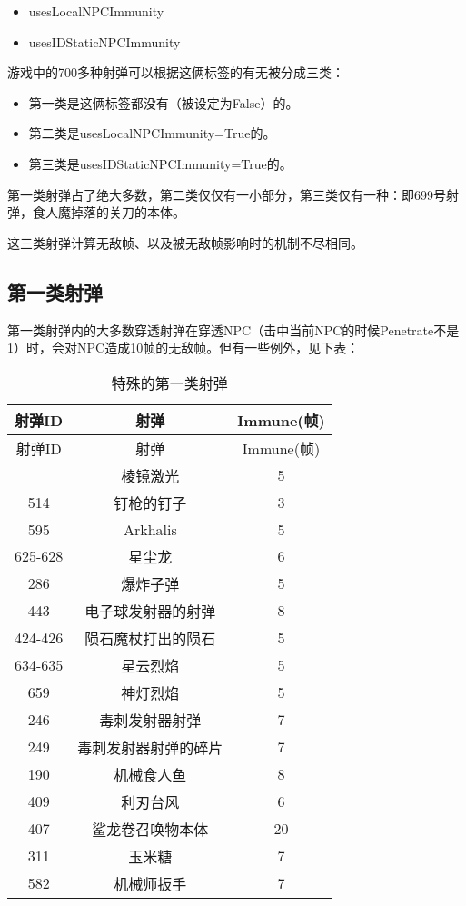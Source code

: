 \begin{itemize}
\item usesLocalNPCImmunity
\item usesIDStaticNPCImmunity
\end{itemize}

游戏中的700多种射弹可以根据这俩标签的有无被分成三类：

\begin{itemize}
\item 第一类是这俩标签都没有（被设定为False）的。
\item 第二类是usesLocalNPCImmunity=True的。
\item 第三类是usesIDStaticNPCImmunity=True的。
\end{itemize}

第一类射弹占了绝大多数，第二类仅仅有一小部分，第三类仅有一种：即699号射弹，食人魔掉落的关刀的本体。

这三类射弹计算无敌帧、以及被无敌帧影响时的机制不尽相同。

\subsection{第一类射弹}

第一类射弹内的大多数穿透射弹在穿透NPC（击中当前NPC的时候Penetrate不是1）时，会对NPC造成10帧的无敌帧。但有一些例外，见下表：

\begin{longtable}{|c|c|c|}
\caption{特殊的第一类射弹}\\ \hline
射弹ID&射弹&Immune(帧)\\ \hline
\endfirsthead
\hline 射弹ID&射弹&Immune(帧)\\\hline
\endhead
\hline
\endfoot
632 & 棱镜激光 & 5 \\ \hline
514 & 钉枪的钉子 & 3 \\ \hline
595 & Arkhalis & 5 \\ \hline
625-628 & 星尘龙 & 6 \\ \hline
286 & 爆炸子弹 & 5 \\ \hline
443 & 电子球发射器的射弹 & 8 \\ \hline
424-426 & 陨石魔杖打出的陨石 & 5 \\ \hline
634-635 & 星云烈焰 & 5 \\ \hline
659 & 神灯烈焰 & 5 \\ \hline
246 & 毒刺发射器射弹 & 7 \\ \hline
249 & 毒刺发射器射弹的碎片 & 7 \\ \hline
190 & 机械食人鱼 & 8 \\ \hline
409 & 利刃台风 & 6 \\ \hline
407 & 鲨龙卷召唤物本体 & 20 \\ \hline
311 & 玉米糖 & 7 \\ \hline
582 & 机械师扳手 & 7
\end{longtable}

